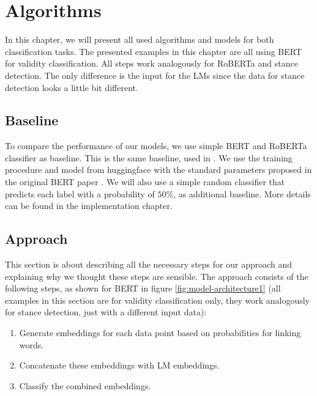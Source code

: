 \section{Algorithms}
In this chapter, we will present all used algorithms and models for both classification tasks. The presented examples in this chapter are all using BERT for validity classification. All steps work analogously for RoBERTa and stance detection. The only difference is the input for the LMs since the data for stance detection looks a little bit different.

\subsection{Baseline}
To compare the performance of our models, we use simple BERT and RoBERTa classifier \cite{bert, roberta} as baseline. This is the same baseline, used in \cite{argsvalidnovel2022}. We use the training procedure and model from huggingface \cite{berttraining} with the standard parameters proposed in the original BERT paper \cite{bert}. We will also use a simple random classifier that predicts each label with a probability of $50\%$, as additional baseline. More details can be found in the implementation chapter.

\subsection{Approach}

This section is about describing all the necessary steps for our approach and explaining why we thought these steps are sensible. The approach consists of the following steps, as shown for BERT in figure \ref{fig:model-architecture1} (all examples in this section are for validity classification only, they work analogously for stance detection, just with a different input data):

\begin{enumerate}
	\item Generate embeddings for each data point based on probabilities for linking words.
	\item Concatenate these embeddings with LM embeddings.
	\item Classify the combined embeddings.
\end{enumerate}


